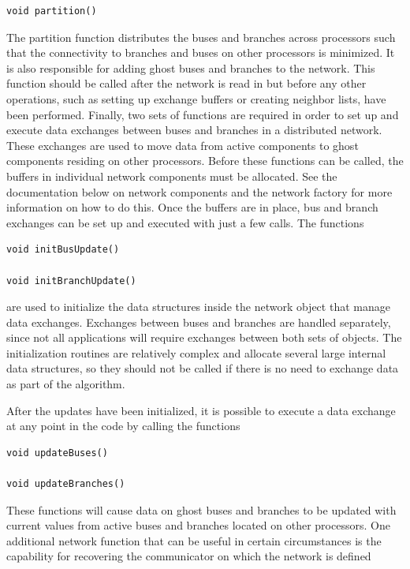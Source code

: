 \documentclass[12pt]{report} %
\begin{document}
{
\color{red}
\begin{Verbatim}[fontseries=b]
void partition()
\end{Verbatim}
}

The partition function distributes the buses and branches across processors such that the connectivity to branches and buses on other processors is minimized. It is also responsible for adding ghost buses and branches to the network. This function should be called after the network is read in but before any other operations, such as setting up exchange buffers or creating neighbor lists, have been performed.
Finally, two sets of functions are required in order to set up and execute data exchanges between buses and branches in a distributed network. These exchanges are used to move data from active components to ghost components residing on other processors. Before these functions can be called, the buffers in individual network components must be allocated. See the documentation below on network components and the network factory for more information on how to do this. Once the buffers are in place, bus and branch exchanges can be set up and executed with just a few calls. The functions

{
\color{red}
\begin{Verbatim}[fontseries=b]
void initBusUpdate()

void initBranchUpdate()
\end{Verbatim}
}

are used to initialize the data structures inside the network object that manage data exchanges. Exchanges between buses and branches are handled separately, since not all applications will require exchanges between both sets of objects. The initialization routines are relatively complex and allocate several large internal data structures, so they should not be called if there is no need to exchange data as part of the algorithm.

After the updates have been initialized, it is possible to execute a data exchange at any point in the code by calling the functions

{
\color{red}
\begin{Verbatim}[fontseries=b]
void updateBuses()

void updateBranches()
\end{Verbatim}
}

These functions will cause data on ghost buses and branches to be updated with current values from active buses and branches located on other processors.
One additional network function that can be useful in certain circumstances is the capability for recovering the communicator on which the network is defined
\end{document}
